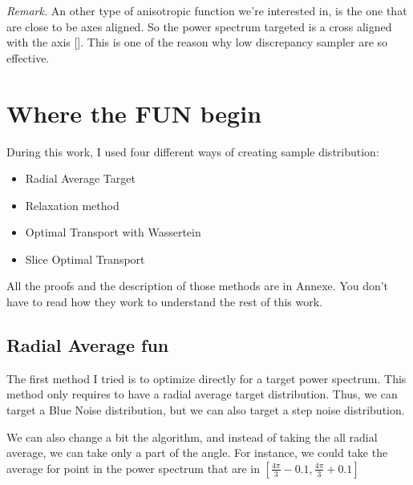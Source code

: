 \documentclass{classeENS}
\begin{document}
\> \textit{Remark.} An other type of anisotropic function we're interested in, 
    is the one that are close to be axes aligned. So the power spectrum 
    targeted is a cross aligned with the axis [\cite{singh17convergence}]. 
    This is one of the reason why 
    low discrepancy sampler are so effective.

\section{Where the FUN begin}

During this work, I used four different ways of creating sample distribution:
\begin{itemize}
    \item Radial Average Target
    \item Relaxation method
    \item Optimal Transport with Wassertein
    \item Slice Optimal Transport 
\end{itemize}
All the proofs and the description of those methods are in Annexe. 
You don't have to read how they work to understand the rest of this work.

\subsection{Radial Average fun}
    The first method I tried is to optimize directly for a target power spectrum.
    This method only requires to have a radial average target distribution. Thus, we can
    target a Blue Noise distribution, but we can also target a step noise distribution.
    
    We can also change a bit the algorithm, and instead of taking the all radial average,
    we can take only a part of the angle. For instance, we could take the average for
    point in the power spectrum that are in $[\frac{4\pi}{3} - 0.1, \frac{4\pi}{3}+0.1]$
    
\end{document}
